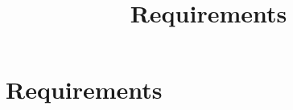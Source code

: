 \documentclass{projdoc}
\title{Requirements}
\begin{document}
\section{Requirements}
\begin{multicols}{2}

\end{multicols}
\end{document}
